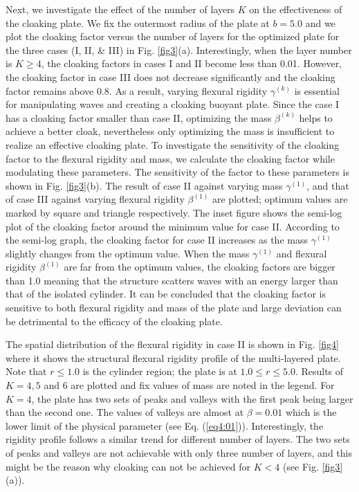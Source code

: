 \documentclass{jfm}
\begin{document}
Next, we investigate the effect of the number of layers $K$ on the effectiveness of the cloaking plate. We fix the outermost radius of the plate at $b=5.0$ and we plot the cloaking factor versus the number of layers for the optimized plate for the three cases (I, II, \& III) in Fig. \ref{fig3}(a). Interestingly, when the layer number is $K\ge 4$, the cloaking factors in cases I and II become less than 0.01. However, the cloaking factor in case III does not decrease significantly and the cloaking factor remains above 0.8. As a result, varying flexural rigidity $\gamma^{(k)}$ is essential for manipulating waves and creating a cloaking buoyant plate. Since the case I has a  cloaking factor smaller than case II, optimizing the mass $\beta^{(k)}$ helps to achieve a better cloak, nevertheless only optimizing the mass is insufficient to realize an effective cloaking plate. To investigate the sensitivity of the cloaking factor to the flexural rigidity and mass, we calculate the cloaking factor while modulating these parameters. 
The sensitivity of the factor to these parameters is shown in Fig. \ref{fig3}(b).
The result of case II against varying mass $\gamma^{(1)}$, and that of case III against varying flexural rigidity $\beta^{(1)}$ are plotted; optimum values are marked by square and triangle respectively. 
The inset figure shows the semi-log plot of the cloaking factor around the minimum value for case II.
According to the semi-log graph, the cloaking factor for case II increases as the mass $\gamma^{(1)}$ slightly changes from the optimum value.
When the mass $\gamma^{(1)}$ and flexural rigidity $\beta^{(1)}$ are far from the optimum values, the cloaking factors are bigger than 1.0 meaning that the structure scatters waves with an energy larger than that of the isolated cylinder. It can be concluded that the cloaking factor is sensitive to both flexural rigidity and mass of the plate and large deviation can be detrimental to the efficacy of the cloaking plate. 



The spatial distribution of the flexural rigidity in case II is shown in Fig. \ref{fig4} where it shows the structural flexural rigidity profile of the multi-layered plate. Note that $r\le 1.0$ is the cylinder region; the plate is at $1.0\le r\le 5.0$. Results of $K=4,5$ and $6$ are plotted and fix values of mass are noted in the legend. For $K=4$, the plate has two sets of peaks and valleys with the first peak being larger than the second one.
The values of valleys are almost at $\beta = 0.01$ which is the lower limit of the physical parameter (see Eq. (\ref{eq4:01})).
Interestingly, the rigidity profile follows a similar trend for different number of layers. The two sets of peaks and valleys are not achievable with only three number of layers, and this might be the reason why cloaking can not be achieved for $K<4$ (see Fig. \ref{fig3}(a)). 
\end{document}
